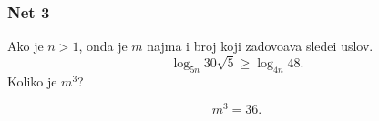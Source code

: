 \subsubsection{Net 3}
 
\zadatak Ako je $n>1$, onda je $m$ najma{\nj} i broj koji zadovo{\lj}ava slede{\cc}i uslov.
$$
\log_{5n} 30\sqrt5 \ge \log_{4n} 48.
$$
Koliko je $m^3$?

\resenje
$$
m^3 = 36.
$$